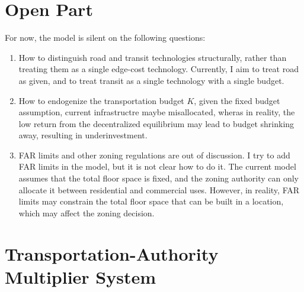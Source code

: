 \documentclass[12pt, a4paper]{article}
\theoremstyle{definition}
\theoremstyle{remark}
\begin{document}
\section{Open Part}
For now, the model is silent on the following questions:
\begin{enumerate}
    \item How to distinguish road and transit technologies structurally, rather than treating them as a single edge-cost technology. Currently, I aim to treat road as given, and to treat transit as a single technology with a single budget.
    \item How to endogenize the transportation budget $K$, given the fixed budget assumption, current infrastructre maybe misallocated, wheras in reality, the low return from the decentralized equilibrium may lead to budget shrinking away, resulting in underinvestment.
    \item FAR limits and other zoning regulations are out of discussion. I try to add FAR limits in the model, but it is not clear how to do it. The current model assumes that the total floor space is fixed, and the zoning authority can only allocate it between residential and commercial uses. However, in reality, FAR limits may constrain the total floor space that can be built in a location, which may affect the zoning decision.
\end{enumerate}
\appendix
\section{Transportation-Authority Multiplier System}
\label{app:ta-multipliers}
\end{document}
